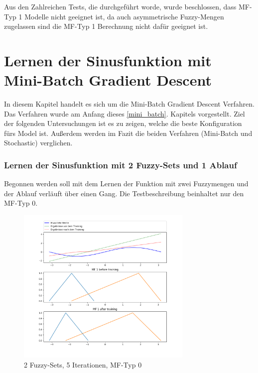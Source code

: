 {Aus den Zahlreichen Tests, die durchgeführt worde, wurde beschlossen, dass MF-Typ 1 Modelle nicht geeignet ist, da auch asymmetrische Fuzzy-Mengen zugelassen sind die MF-Typ 1 Berechnung nicht dafür geeignet ist. 
%	
\section{Lernen der Sinusfunktion mit Mini-Batch Gradient Descent}\label{lernen_mb}

In diesem Kapitel handelt es sich um die Mini-Batch Gradient Descent Verfahren. Das Verfahren wurde am Anfang dieses \ref{mini_batch}. Kapitels vorgestellt. Ziel der folgenden Untersuchungen ist es zu zeigen, welche die beste Konfiguration fürs Model ist. Außerdem werden im Fazit die beiden Verfahren (Mini-Batch und Stochastic) verglichen. 

\subsubsection{Lernen der Sinusfunktion mit 2 Fuzzy-Sets und 1 Ablauf}

Begonnen werden soll mit dem Lernen der Funktion mit zwei Fuzzymengen und der Ablauf verläuft über einen Gang. Die Testbeschreibung beinhaltet nur den MF-Typ 0.

\begin{figure}[htbp]
	\centering
	\includegraphics[width=0.75\textwidth]{images/sinus/Mini-Batch/sinus 1 Input 2 Sets 5 Epochs Mini-Batch Gradient Descent two equations mf.png}
	\caption{2 Fuzzy-Sets, 5 Iterationen, MF-Typ 0} \label{2mini_batch5:0}
\end{figure}

}
